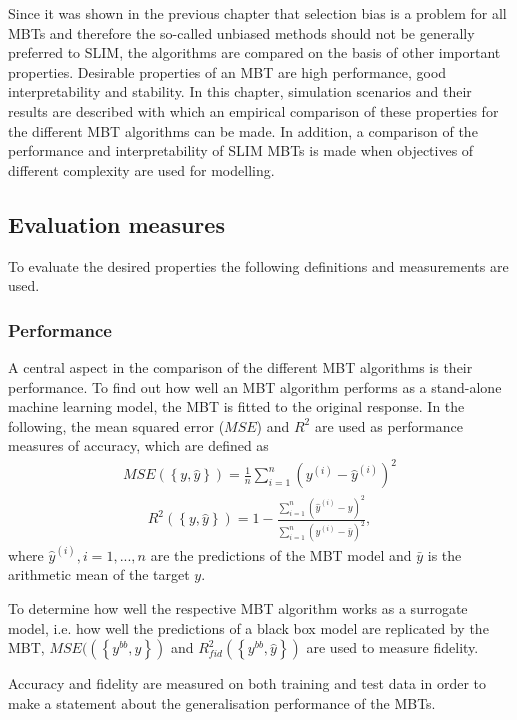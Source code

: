 Since it was shown in the previous chapter that selection bias is a problem for all MBTs and therefore the so-called unbiased methods should not be generally preferred to SLIM, the algorithms are compared on the basis of other important properties.
Desirable properties of an MBT are high performance, good interpretability and stability.
In this chapter, simulation scenarios and their results are described with which an empirical comparison of these properties for the different MBT algorithms can be made.
In addition, a comparison of the performance and interpretability of SLIM MBTs is made when objectives of different complexity are used for modelling.

\subsection{Evaluation measures}
To evaluate the desired properties the following definitions and measurements are used.

\subsubsection{Performance}
A central aspect in the comparison of the different MBT algorithms is their performance. 
To find out how well an MBT algorithm performs as a stand-alone machine learning model, the MBT is fitted to the original response. 
In the following, the mean squared error ($MSE$) and $R^2$ are used as performance measures of accuracy, which are defined as
\begin{align}
    MSE \left( \left\{y, \hat{y}\right\}\right) = \frac{1}{n}\sum_{i = 1}^{n}\left(y^{(i)}-\hat{y}^{(i)}\right)^2
\end{align}
\begin{align}
    R^2\left( \left\{y, \hat{y}\right\}\right) = 1-\frac{\sum_{i = 1}^{n}\left(\hat{y}^{(i) } - y\right)^2}{\sum_{i = 1}^{n}\left(y^{(i)} - \bar{y}\right)^2},
\end{align}
where $\hat{y}^{(i)}, i = 1,...,n$ are the predictions of the MBT model and $\bar{y}$ is the arithmetic mean of the target $y$.

To determine how well the respective MBT algorithm works as a surrogate model, i.e. how well the predictions of a black box model are replicated by the MBT, $MSE(\left( \left\{y^{bb}, \hat{y}\right\}\right)$ and $R^2_{fid}\left( \left\{y^{bb}, \hat{y}\right\}\right)$ are used to measure fidelity. 

Accuracy and fidelity are measured on both training and test data in order to make a statement about the generalisation performance of the MBTs.

